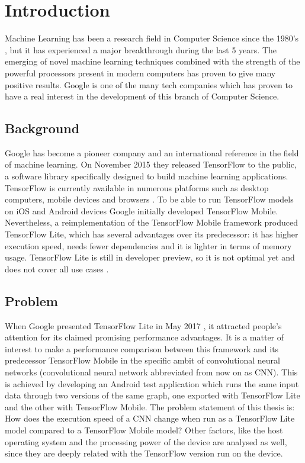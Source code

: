 \section{Introduction}
Machine Learning has been a research field in Computer Science since the 1980's \cite{harnad2008annotation}, but it has experienced a major breakthrough during the last 5 years. The emerging of novel machine learning techniques combined with the strength of the powerful processors present in modern computers has proven to give many positive results. Google is one of the many tech companies which has proven to have a real interest in the development of this branch of Computer Science. \\

\subsection{Background}
Google has become a pioneer company and an international reference in the field of machine learning. On November 2015 they released TensorFlow to the public, a software library specifically designed to build machine learning applications. TensorFlow is currently available in numerous platforms such as desktop computers, mobile devices and browsers \cite{abadi2016tensorflow}. To be able to run TensorFlow models on iOS and Android devices Google initially developed TensorFlow Mobile. Nevertheless, a reimplementation of the TensorFlow Mobile framework produced TensorFlow Lite, which has several advantages over its predecessor: it has higher execution speed, needs fewer dependencies and it is lighter in terms of memory usage. TensorFlow Lite is still in developer preview, so it is not optimal yet and does not cover all use cases \cite{litevsmobile}. \\


\subsection{Problem}
When Google presented TensorFlow Lite in May 2017 \cite{techcrunch}, it attracted people's attention for its claimed promising performance advantages. It is a matter of interest to make a performance comparison between this framework and its predecessor TensorFlow Mobile in the specific ambit of convolutional neural networks (convolutional neural network abbreviated from now on as CNN). This is achieved by developing an Android test application which runs the same input data through two versions of the same graph, one exported with TensorFlow Lite and the other with TensorFlow Mobile. The problem statement of this thesis is: How does the execution speed of a CNN change when run as a TensorFlow Lite model compared to a TensorFlow Mobile model? Other factors, like the host operating system and the processing power of the device are analysed as well, since they are deeply related with the TensorFlow version run on the device. 

